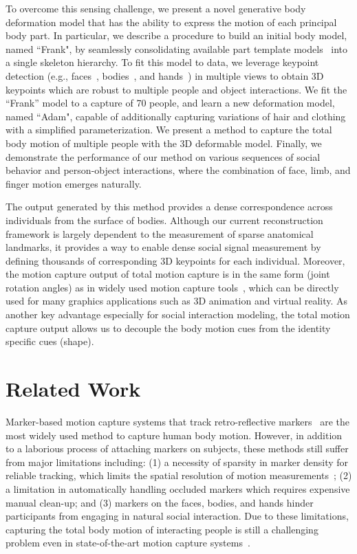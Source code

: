 To overcome this sensing challenge, we present a novel generative body deformation model that has the ability to express the motion of each principal body part. In particular, we describe a procedure to build an initial body model, named ``Frank", by seamlessly consolidating available part template models~\cite{Loper2015,cao2014facewarehouse} into a single skeleton hierarchy. To fit this model to data, we leverage keypoint detection (e.g., faces~\cite{Torre15}, bodies~\cite{Wei2016,cao2017realtime,Newell-16}, and hands~\cite{simon2017hand}) in multiple views to obtain 3D keypoints which are robust to multiple people and object interactions. We fit the ``Frank'' model to a capture of 70 people, and learn a new deformation model, named ``Adam", capable of additionally capturing variations of hair and clothing with a simplified parameterization. We present a method to capture the total body motion of multiple people with the 3D deformable model. Finally, we demonstrate the performance of our method on various sequences of social behavior and person-object interactions, where the combination of face, limb, and finger motion emerges naturally.

The output generated by this method provides a dense correspondence across individuals from the surface of bodies. Although our current reconstruction framework is largely dependent to the measurement of sparse anatomical landmarks, it provides a way to enable dense social signal measurement by defining thousands of corresponding 3D keypoints for each individual. Moreover, the motion capture output of total motion capture is in the same form (joint rotation angles) as in widely used motion capture tools~\cite{VICON}, which can be directly used for many graphics applications such as 3D animation and virtual reality. As another key advantage especially for social interaction modeling, the total motion capture output allows us to decouple the body motion cues from the identity specific cues (shape). 

\section{Related Work}

Marker-based motion capture systems that track retro-reflective markers~\cite{VICON, woltring1973new} are the most widely used method to capture human body motion. However, in addition to a laborious process of attaching markers on subjects, these methods still suffer from major limitations including: (1) a necessity of sparsity in marker density for reliable tracking, which limits the spatial resolution of motion measurements~\cite{park2006capturing}; (2) a limitation in automatically handling occluded markers which requires expensive manual clean-up; and (3) markers on the faces, bodies, and hands hinder participants from engaging in natural social interaction. Due to these limitations, capturing the total body motion of interacting people is still a challenging problem even in state-of-the-art motion capture systems~\cite{VICON}. 

